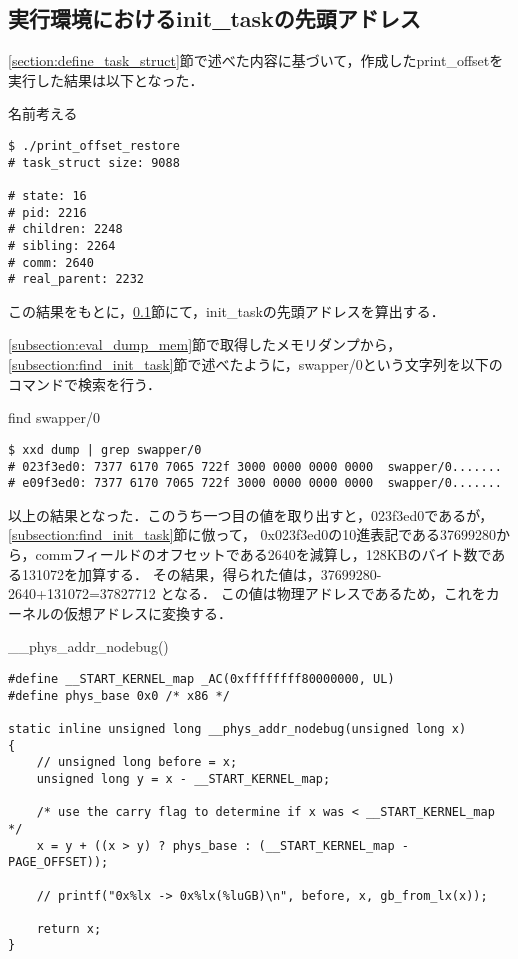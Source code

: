 \subsection{実行環境におけるinit_taskの先頭アドレス}
\label{subsection:eval_init_task_head}

\ref{section:define_task_struct}節で述べた内容に基づいて，作成したprint_offsetを実行した結果は以下となった．

\begin{itembox}[l]{名前考える}
    \begin{verbatim}
$ ./print_offset_restore
# task_struct size: 9088

# state: 16
# pid: 2216
# children: 2248
# sibling: 2264
# comm: 2640
# real_parent: 2232
    \end{verbatim}
\end{itembox}

この結果をもとに，\ref{subsection:eval_init_task_head}節にて，init\_taskの先頭アドレスを算出する．

\ref{subsection:eval_dump_mem}節で取得したメモリダンプから，\ref{subsection:find_init_task}節で述べたように，swapper/0という文字列を以下のコマンドで検索を行う．

\begin{itembox}[l]{find swapper/0}
    \begin{verbatim}
$ xxd dump | grep swapper/0
# 023f3ed0: 7377 6170 7065 722f 3000 0000 0000 0000  swapper/0.......
# e09f3ed0: 7377 6170 7065 722f 3000 0000 0000 0000  swapper/0.......
    \end{verbatim}
\end{itembox}

以上の結果となった．このうち一つ目の値を取り出すと，023f3ed0であるが，\ref{subsection:find_init_task}節に倣って，
0x023f3ed0の10進表記である37699280から，commフィールドのオフセットである2640を減算し，128KBのバイト数である131072を加算する．
その結果，得られた値は，37699280-2640+131072=37827712 となる．
この値は物理アドレスであるため，これをカーネルの仮想アドレスに変換する．

\begin{itembox}[l]{__phys_addr_nodebug()}
    \begin{verbatim}
#define __START_KERNEL_map _AC(0xffffffff80000000, UL)
#define phys_base 0x0 /* x86 */

static inline unsigned long __phys_addr_nodebug(unsigned long x)
{
    // unsigned long before = x;
    unsigned long y = x - __START_KERNEL_map;

    /* use the carry flag to determine if x was < __START_KERNEL_map */
    x = y + ((x > y) ? phys_base : (__START_KERNEL_map - PAGE_OFFSET));

    // printf("0x%lx -> 0x%lx(%luGB)\n", before, x, gb_from_lx(x));

    return x;
}
    \end{verbatim}
\end{itembox}

